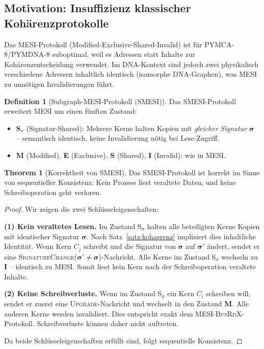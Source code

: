﻿\documentclass[a4paper,12pt]{article}
\theoremstyle{definition}
\newtheorem{definition}{Definition}[section]
\newtheorem{theorem}{Theorem}[section]
\begin{document}
\subsection{Motivation: Insuffizienz klassischer Kohärenzprotokolle}

Das MESI-Protokoll (Modified-Exclusive-Shared-Invalid) ist für
PYMCA-8/PYMDNA-8 suboptimal, weil es Adressen statt Inhalte zur
Kohärenzentscheidung verwendet. Im DNA-Kontext sind jedoch zwei
physikalisch verschiedene Adressen inhaltlich identisch (isomorphe
DNA-Graphen), was MESI zu unnötigen Invalidierungen führt.

\begin{definition}[Subgraph-MESI-Protokoll (SMESI)]
  \label{def:smesi}
  Das SMESI-Protokoll erweitert MESI um einen fünften Zustand:
  \begin{itemize}[noitemsep]
    \item \textbf{S$_\sigma$} (Signatur-Shared): Mehrere Kerne halten
      Kopien mit \emph{gleicher Signatur} $\boldsymbol{\sigma}$ --
      semantisch identisch, keine Invalidierung nötig bei Lese-Zugriff.
    \item \textbf{M} (Modified), \textbf{E} (Exclusive), \textbf{S} (Shared),
      \textbf{I} (Invalid): wie in MESI.
  \end{itemize}
\end{definition}

\begin{theorem}[Korrektheit von SMESI]
  \label{thm:smesi_korrekt}
  Das SMESI-Protokoll ist korrekt im Sinne von sequentieller Konsistenz:
  Kein Prozess liest veraltete Daten, und keine Schreiboperation geht verloren.
\end{theorem}

\begin{proof}
  Wir zeigen die zwei Schlüsseleigenschaften:

  \textbf{(1) Kein veraltetes Lesen.} Im Zustand S$_\sigma$ halten alle
  beteiligten Kerne Kopien mit identischer Signatur $\boldsymbol{\sigma}$.
  Nach Satz~\ref{satz:kohaerenz} impliziert dies inhaltliche Identität.
  Wenn Kern $C_j$ schreibt und die Signatur von $\boldsymbol{\sigma}$ auf
  $\boldsymbol{\sigma}'$ ändert, sendet er eine
  \textsc{SignatureChange}($\boldsymbol{\sigma}' \neq \boldsymbol{\sigma}$)-Nachricht.
  Alle Kerne im Zustand S$_\sigma$ wechseln zu \textbf{I} -- identisch zu MESI.
  Somit liest kein Kern nach der Schreiboperation veraltete Inhalte.

  \textbf{(2) Keine Schreibverluste.} Wenn im Zustand S$_\sigma$ ein Kern
  $C_i$ schreiben will, sendet er zuerst eine \textsc{Upgrade}-Nachricht
  und wechselt in den Zustand \textbf{M}. Alle anderen Kerne werden
  invalidiert. Dies entspricht exakt dem MESI-\textsc{BusRdX}-Protokoll.
  Schreibverluste können daher nicht auftreten.

  Da beide Schlüsseleigenschaften erfüllt sind, folgt sequentielle Konsistenz.
\end{proof}
\end{document}
